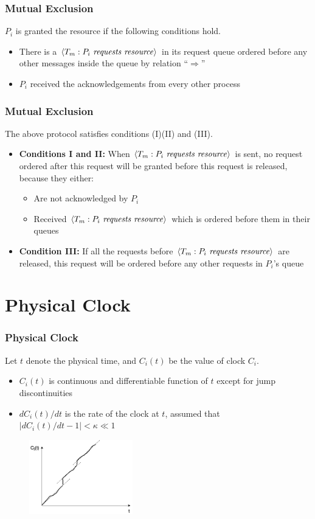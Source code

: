 \documentclass{beamer}
\begin{document}
\frame
{
  \frametitle{Mutual Exclusion}

  $P_i$ is granted the resource if the following conditions hold.

  \begin{itemize}
  	\item<2-> There is a $\langle T_m:P_i\text{ \emph{requests resource}}\rangle$ in its request queue ordered before any other messages inside the queue by relation ``$\Rightarrow$''
  	\item<3-> $P_i$ received the acknowledgements from every other process
  \end{itemize}
}

\frame
{
  \frametitle{Mutual Exclusion}
  The above protocol satisfies conditions (I)(II) and (III).

  \begin{itemize}
  	\item<2-> \textbf{Conditions I and II:} When $\langle T_m:P_i\text{ \emph{requests resource}}\rangle$ is sent, no request ordered after this request will be granted before this request is released, because they either:
  		\begin{itemize}
  			\item Are not acknowledged by $P_i$
  			\item Received $\langle T_m:P_i\text{ \emph{requests resource}}\rangle$ which is ordered before them in their queues
  		\end{itemize}
		\item<3-> \textbf{Condition III:} If all the requests before $\langle T_m:P_i\text{ \emph{requests resource}}\rangle$ are released, this request will be ordered before any other requests in $P_i$'s queue
  \end{itemize}
}

\section{Physical Clock}
\frame
{
  \frametitle{Physical Clock}
  Let $t$ denote the physical time, and $C_i(t)$ be the value of clock $C_i$.

  \begin{itemize}
  	\item\pause $C_i(t)$ is continuous and differentiable function of $t$ except for jump discontinuities
  	\item\pause $dC_i(t)/dt$ is the rate of the clock at $t$, assumed that $\left|dC_i(t)/dt-1\right|<\kappa\ll 1$
  \end{itemize}

  \pause
  \begin{figure}[ht!]
  \includegraphics[width=0.4\textwidth]{files/ClockDist-Physical-Clock.png}
  \end{figure}

}
\end{document}
